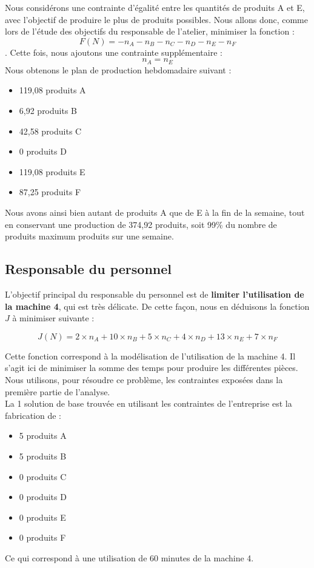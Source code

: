 \documentclass[a4paper,10pt]{article}
\begin{document}
Nous considérons une contrainte d'égalité entre les quantités de produits A et E, avec l'objectif de produire le plus de produits possibles. Nous allons donc, comme lors de l'étude des objectifs du responsable de l'atelier, minimiser la fonction :
$$F(N) = - n_A - n_B - n_C - n_D - n_E - n_F$$.
Cette fois, nous ajoutons une contrainte supplémentaire :
$$n_A = n_E$$
Nous obtenons le plan de production hebdomadaire suivant :
\begin{itemize}
\item[\textbullet] 119,08 produits A
\item[\textbullet] 6,92 produits B
\item[\textbullet] 42,58 produits C
\item[\textbullet] 0 produits D
\item[\textbullet] 119,08 produits E
\item[\textbullet] 87,25 produits F\newline
\end{itemize}

Nous avons ainsi bien autant de produits A que de E à la fin de la semaine, tout en conservant une production de 374,92 produits, soit 99\% du nombre de produits maximum produits sur une semaine.



\subsection{Responsable du personnel}

L'objectif principal du responsable du personnel est de \textbf{limiter l'utilisation de la machine 4}, qui est très délicate. De cette façon, nous en déduisons la fonction $J$ à minimiser suivante :

$$J(N)=2 \times n_A + 10 \times n_B + 5 \times n_C + 4 \times n_D + 13 \times n_E + 7 \times n_F$$

Cette fonction correspond à la modélisation de l'utilisation de la machine 4. Il s'agit ici de minimiser la somme des temps pour produire les différentes pièces. Nous utilisons, pour résoudre ce problème, les contraintes exposées dans la première partie de l'analyse.\\

La 1\iere{} solution de base trouvée en utilisant les contraintes de l'entreprise est la fabrication de :\newline
\begin{itemize}
\item[\textbullet] 5 produits A
\item[\textbullet] 5 produits B
\item[\textbullet] 0 produits C
\item[\textbullet] 0 produits D
\item[\textbullet] 0 produits E
\item[\textbullet] 0 produits F\newline
\end{itemize}
Ce qui correspond à une utilisation de 60 minutes de la machine 4.\newline
\end{document}
